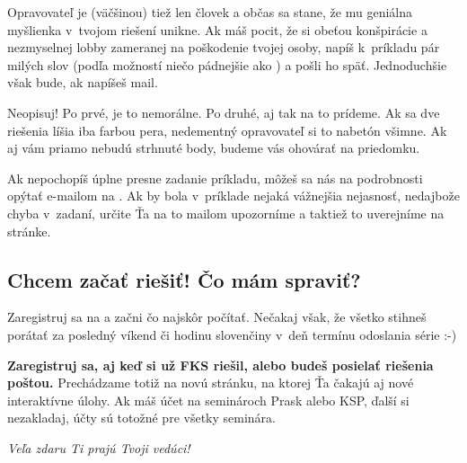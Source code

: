 	Opravovateľ je (väčšinou) tiež len človek a občas sa stane, že mu geniálna
	myšlienka v~tvojom riešení unikne. Ak máš pocit, že si obeťou konšpirácie a
	nezmyselnej lobby zameranej na poškodenie tvojej osoby, napíš k~príkladu pár
	milých slov (podľa možností niečo pádnejšie ako ) a pošli
	ho späť. Jednoduchšie však bude, ak napíšeš mail.

	Neopisuj! Po prvé, je to nemorálne. Po druhé, aj tak na to prídeme. Ak sa dve riešenia
	líšia iba farbou pera, nedementný opravovateľ si to nabetón všimne. Ak aj vám
	priamo nebudú strhnuté body, budeme vás ohovárať na priedomku.

	Ak nepochopíš úplne presne zadanie príkladu, môžeš sa nás na podrobnosti opýtať
	e-mailom na {\URL{\seminarEmail}}. Ak by bola v~príklade nejaká vážnejšia
	nejasnosť, nedajbože chyba v~zadaní, určite Ťa na to mailom upozorníme a taktiež to uverejníme na stránke.

\subsection{Chcem začať riešiť! Čo mám spraviť?}
	Zaregistruj sa na \URL{\seminarURL} a začni čo najskôr počítať. Nečakaj však, že všetko stihneš porátať
	za posledný víkend či hodinu slovenčiny v~deň termínu odoslania série :-)

\textbf{Zaregistruj sa, aj keď si už FKS riešil, alebo budeš posielať riešenia poštou.}
Prechádzame totiž na novú stránku, na ktorej Ťa čakajú aj nové interaktívne úlohy. Ak máš účet na seminároch Prask alebo KSP, ďalší si nezakladaj, účty sú totožné pre všetky seminára.

\hfill \emph{Veľa zdaru Ti prajú Tvoji vedúci!}
